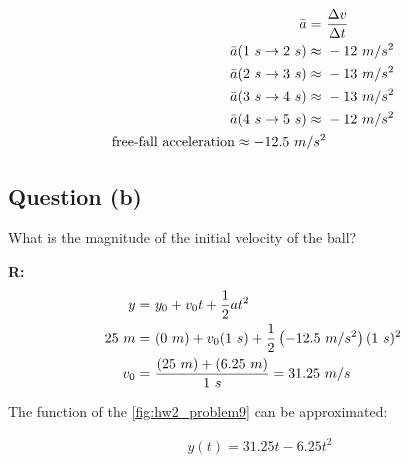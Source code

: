 		\begin{align}
			\bar{a} = \ &\frac{\Delta v}{\Delta t} \notag \\
			\bar{a}(1 \ s \to 2 \ s) \approx \ &-12 \ m/s^{2}& \notag \\
			\bar{a}(2 \ s \to 3 \ s) \approx \ &-13 \ m/s^{2}&  \notag \\
			\bar{a}(3 \ s \to 4 \ s) \approx \ &-13 \ m/s^{2}&  \notag \\
			\bar{a}(4 \ s \to 5 \ s) \approx \ &-12 \ m/s^{2}&  \notag \\
			\text{free-fall acceleration} \approx -12.5 \ m/s^{2}
		\end{align}

	\subsection{Question (b)}
		What is the magnitude of the initial velocity of the ball?

		\textbf{R:} \newline
		\begin{align}
			y = \ &y_{0} + v_{0}t + \frac{1}{2}at^{2}& \notag \\
			25 \ m = \ &(0 \ m) + v_{0}(1 \ s) + \frac{1}{2}\left( -12.5 \ m/s^{2} \right)(1 \ s)^{2}& \notag \\
			v_{0} = \ &\frac{(25 \ m) + (6.25 \ m)}{1 \ s} = 31.25 \ m/s&
		\end{align}

		The function of the \cref{fig:hw2_problem9} can be approximated:

		\begin{align}
			y(t) = 31.25t - 6.25t^{2}
		\end{align}
